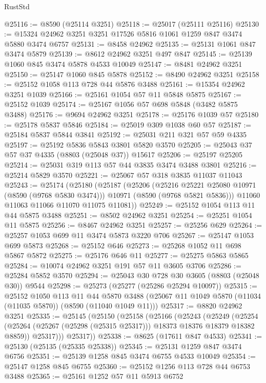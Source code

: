 \begin{lexlean}{RustStd}
\begin{coremodule}
@25116 := @8590 (@25114 @3251)
@25118 := @25017 (@25111 @25116)
@25130 := @15324 @24962 @3251 @3251 @17526 @5816 @1061 @1259 @847 @3474 @5880 @3474 @6757
@25131 := @8458 @24962
@25135 := @25131 @1061 @847 @3474 @5879
@25139 := @8612 @24962 @3251 @497 @847
@25145 := @25139 @1060 @845 @3474 @5878 @4533 @10049
@25147 := @8481 @24962 @3251
@25150 := @25147 @1060 @845 @5878
@25152 := @8490 @24962 @3251
@25158 := @25152 @1058 @113 @728 @44 @5876 @3488
@25161 := @15354 @24962 @3251 @1039
@25166 := @25161 @1054 @57 @11 @5848 @5875
@25167 := @25152 @1039
@25174 := @25167 @1056 @57 @698 @5848 (@3482 @5875 @3488)
@25176 := @9694 @24962 @3251
@25178 := @25176 @1039 @57
@25180 := @25178 @5837 @5846
@25184 := @25019 @309 @1038 @60 @57
@25187 := @25184 @5837 @5844 @3841
@25192 := @25031 @211 @321 @57 @59 @4335
@25197 := @25192 @5836 @5843 @3801 @5820 @3570
@25205 := @25043 @37 @57 @37 @4335 (@8803 (@25048 @37)) @15617
@25206 := @25197 @25205
@25214 := @25031 @319 @113 @57 @44 @3835 @3474 @3488 @3801
@25216 := @25214 @5829 @3570
@25221 := @25067 @57 @318 @3835 @11037 @11043
@25243 := @25174
    (@25180
      (@25187
        (@25206
          (@25216 @25221 @25080 @10971 (@8590 (@9768 @5830 @3474)))
          @10971
          (@8590 (@9768 @5821 @5836)))
        @11060
        @11063
        @11066
        @11070
        @11075
        @11081))
@25249 := @25152 @1054 @113 @11 @44 @5875 @3488
@25251 := @8502 @24962 @3251
@25254 := @25251 @1054 @11 @5875
@25256 := @8467 @24962 @3251
@25257 := @25256 @629
@25264 := @25257 @1053 @699 @11 @3474 @5873 @3220 @706
@25267 := @25147 @1053 @699 @5873
@25268 := @25152 @646
@25273 := @25268 @1052 @11 @698 @5867 @5872
@25275 := @25176 @646 @11
@25277 := @25275 @5863 @5865
@25284 := @10074 @24962 @3251 @191 @57 @11 @3605 @3706
@25286 := @25284 @5852 @3570
@25294 := @25043 @30 @728 @30 @3605 (@8803 (@25048 @30)) @9544
@25298 := @25273 (@25277 (@25286 @25294 @10097))
@25315 := @25152
    @1050
    @113
    @11
    @44
    @5870
    @3488
    (@25067 @11 @1049 @5870 (@11034 (@11035 @5870)) (@8590 (@11040 @1049 @11)))
@25317 := @8820 @24962 @3251
@25335 := @25145
    (@25150
      (@25158
        (@25166
          (@25243
            (@25249
              (@25254 (@25264 (@25267 (@25298 (@25315 @25317))) @18373 @18376 @18379 @18382 @8859))
              @25317)))
        @25317))
@25338 := @8625 (@17611 @847 @4533)
@25341 := @25130 (@25135 (@25335 @25338))
@25345 := @25131 @1259 @847 @3474 @6756
@25351 := @25139 @1258 @845 @3474 @6755 @4533 @10049
@25354 := @25147 @1258 @845 @6755
@25360 := @25152 @1256 @113 @728 @44 @6753 @3488
@25365 := @25161 @1252 @57 @11 @5913 @6752

\end{coremodule}
\end{lexlean}

